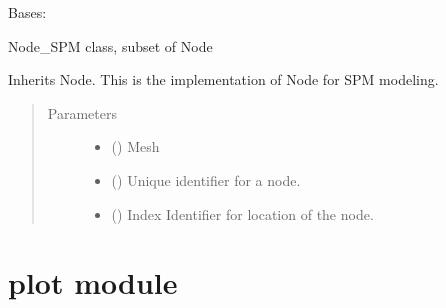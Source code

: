 \documentclass[letterpaper,10pt,english]{sphinxmanual}
\begin{document}
\begin{fulllineitems}
\label{\detokenize{node:node.Node_SPM}}
\sphinxAtStartPar
Bases: {\hyperref[\detokenize{node:node.Node}]{}}

\sphinxAtStartPar
Node\_SPM class, subset of Node

\sphinxAtStartPar
Inherits Node. This is the implementation of Node for SPM
modeling.
\begin{quote}\begin{description}
\item[{Parameters}] \leavevmode\begin{itemize}
\item {} 
\sphinxAtStartPar
{} (\sphinxstyleliteralemphasis{\sphinxupquote{{[}}}\sphinxstyleliteralemphasis{\sphinxupquote{{]}}}) \textendash{} Mesh

\item {} 
\sphinxAtStartPar
{} (\sphinxstyleliteralemphasis{\sphinxupquote{{[}}}\sphinxstyleliteralemphasis{\sphinxupquote{{]}}}) \textendash{} Unique identifier for a node.

\item {} 
\sphinxAtStartPar
{} (\sphinxstyleliteralemphasis{\sphinxupquote{{[}}}\sphinxstyleliteralemphasis{\sphinxupquote{{]}}}) \textendash{} Index Identifier for location of the node.

\end{itemize}

\end{description}\end{quote}

\end{fulllineitems}



\section{plot module}
\label{\detokenize{plot:plot-module}}\label{\detokenize{plot::doc}}
\end{document}
